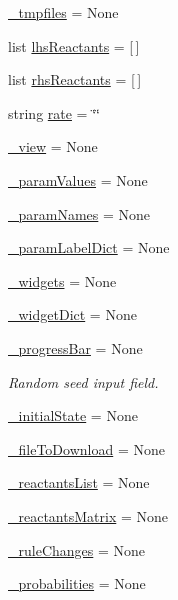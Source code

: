 \begin{DoxyCompactItemize}
\hyperlink{namespace_mu_mo_t_a3f2d20ce626e9e6cdc4a4662727121e6}{\+\_\+tmpfiles} = None
\item 
list \hyperlink{namespace_mu_mo_t_ac74b250c5bb6d9c932272ab5ba3e7a9a}{lhs\+Reactants} = \mbox{[}$\,$\mbox{]}
\item 
list \hyperlink{namespace_mu_mo_t_ad26a9ebdfecee5e673d2091e9780a5df}{rhs\+Reactants} = \mbox{[}$\,$\mbox{]}
\item 
string \hyperlink{namespace_mu_mo_t_a1d580470818c2fa51a0bf3a86bc595bf}{rate} = \char`\"{}\char`\"{}
\item 
\hyperlink{namespace_mu_mo_t_a27dd8543b5188cdfe40f622d267fe2c5}{\+\_\+view} = None
\item 
\hyperlink{namespace_mu_mo_t_a04608181fa27d9aad4983d3694f7ab17}{\+\_\+param\+Values} = None
\item 
\hyperlink{namespace_mu_mo_t_ac7734326ac8dbbf9bd0d2c9838633195}{\+\_\+param\+Names} = None
\item 
\hyperlink{namespace_mu_mo_t_a13bcda33e0e971cf4ad2710945226add}{\+\_\+param\+Label\+Dict} = None
\item 
\hyperlink{namespace_mu_mo_t_a397d0ee37a222317a1bab7deb1270a13}{\+\_\+widgets} = None
\item 
\hyperlink{namespace_mu_mo_t_a76e960ae74fc597cd22f7132507eaa20}{\+\_\+widget\+Dict} = None
\item 
\hyperlink{namespace_mu_mo_t_a018864aa22d2adb0d3958fb0adbce8e2}{\+\_\+progress\+Bar} = None
\begin{DoxyCompactList}\small\item\em Random seed input field. \end{DoxyCompactList}\item 
\hyperlink{namespace_mu_mo_t_a8afeb8cf5705c6b521f7d6658dab955b}{\+\_\+initial\+State} = None
\item 
\hyperlink{namespace_mu_mo_t_a3736ac3654fb55aba6cd957759cc19c0}{\+\_\+file\+To\+Download} = None
\item 
\hyperlink{namespace_mu_mo_t_a05b076329fdf9f52deb0a1674d1b14e0}{\+\_\+reactants\+List} = None
\item 
\hyperlink{namespace_mu_mo_t_a2fc08b0021064bc60e2a9349157357bc}{\+\_\+reactants\+Matrix} = None
\item 
\hyperlink{namespace_mu_mo_t_a6a882ef2523ac168ac8a5c87e78b8ed0}{\+\_\+rule\+Changes} = None
\item 
\hyperlink{namespace_mu_mo_t_aaf2c34c5022e4e3c872dbee11e50ea9b}{\+\_\+probabilities} = None
\item 

\end{DoxyCompactItemize}
